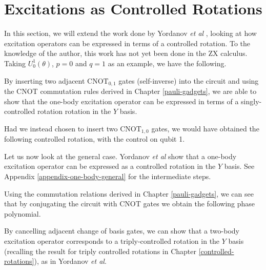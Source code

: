 \section{Excitations as Controlled Rotations}%
\label{operator-controlled-rotations}

In this section, we will extend the work done by Yordanov \textit{et al} \cite{Yordanov2020}, looking at how excitation operators can be expressed in terms of a controlled rotation. To the knowledge of the author, this work has not yet been done in the ZX calculus. Taking $U^1_0(\theta)$, $p = 0$ and $q = 1$ as an example, we have the following.


By inserting two adjacent $\text{CNOT}_{0, 1}$ gates (self-inverse) into the circuit and using the CNOT commutation rules derived in Chapter \ref{pauli-gadgets}, we are able to show that the one-body excitation operator can be expressed in terms of a singly-controlled rotation rotation in the $Y$ basis.


Had we instead chosen to insert two $\text{CNOT}_{1, 0}$ gates, we would have obtained the following controlled rotation, with the control on qubit 1.


Let us now look at the general case. Yordanov \textit{et al} \cite{Yordanov2020} show that a one-body excitation operator can be expressed as a controlled rotation in the $Y$ basis. See Appendix \ref{appendix-one-body-general} for the intermediate steps.


Using the commutation relations derived in Chapter \ref{pauli-gadgets}, we can see that by conjugating the circuit with CNOT gates we obtain the following phase polynomial.


By cancelling adjacent change of basis gates, we can show that a two-body excitation operator corresponds to a triply-controlled rotation in the $Y$ basis (recalling the result for triply controlled rotations in Chapter \ref{controlled-rotations}), as in Yordanov \textit{et al}.

